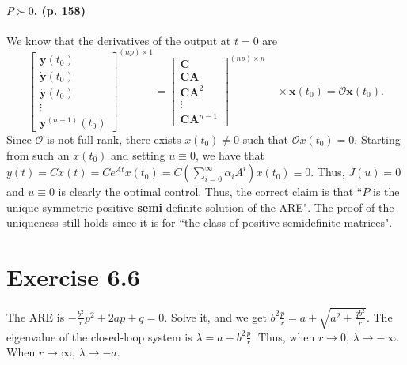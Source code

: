 \documentclass[11pt]{report}
\begin{document}
\paragraph{$P \succ 0$. (p. 158)} We know that the derivatives of the output at $t=0$ are
\[
\left[\begin{array}{c}
\mathbf{y}\left(t_{0}\right) \\
\dot{\mathbf{y}}\left(t_{0}\right) \\
\ddot{\mathbf{y}}\left(t_{0}\right) \\
\vdots \\
\mathbf{y}^{(n-1)}\left(t_{0}\right)
\end{array}\right]^{(n p) \times 1}=\left[\begin{array}{c}
\mathbf{C} \\
\mathbf{C A} \\
\mathbf{C A}^{2} \\
\vdots \\
\mathbf{C A}^{n-1}
\end{array}\right]^{(n p) \times n} \quad \times \mathbf{x}\left(t_{0}\right)=\mathcal{O} \mathbf{x}\left(t_{0}\right).
\]
Since $\mathcal{O}$ is not full-rank, there exists $x(t_0) \neq 0$ such that $\mathcal{O}x(t_0) = 0$. Starting from such an $x(t_0)$ and setting $u \equiv 0$, we have that $y(t) = Cx(t) = Ce^{At}x(t_0) = C\left(\sum_{i=0}^{\infty}\alpha_i A^i\right)x(t_0) \equiv 0$. Thus, $J(u) = 0$ and $u \equiv 0$ is clearly the optimal control. Thus, the correct claim is that ``$P$ is the unique symmetric positive \textbf{semi}-definite solution of the ARE". The proof of the uniqueness still holds since it is for ``the class of positive semidefinite matrices".

\section*{Exercise 6.6}
The ARE is $-\frac{b^2}{r}p^2 + 2ap + q = 0$. Solve it, and we get $b^2\frac{p}{r} = a + \sqrt{a^2+\frac{qb^2}{r}}$. The eigenvalue of the closed-loop system is $\lambda = a - b^2\frac{p}{r}$. Thus, when $r \to 0$, $\lambda \to -\infty$. When $r \to \infty$, $\lambda \to -a$.
\end{document}
